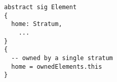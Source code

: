 \lstset{frame=tb, aboveskip=12pt, belowskip=-3pt, breaklines=true, basicstyle=\small\ttfamily, tabsize=2, mathescape=true}
\begin{lstlisting}[caption={structure.als, lines 56-72}, label=alloy:element-home, captionpos=b]
abstract sig Element
{
  home: Stratum,
    ...
}
{
  -- owned by a single stratum
  home = ownedElements.this
}
\end{lstlisting}